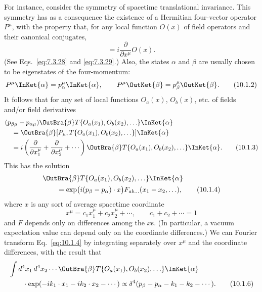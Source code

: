 For instance, consider the symmetry of spacetime translational invariance.
This symmetry has as a consequence the existence of a Hermitian
four-vector operator $P^\mu$, with the property that, for any local function
$O(x)$ of field operators and their canonical conjugates,
\begin{equation}
  [P_\mu,O(x)]=i\frac{\partial}{\partial x^\mu}O(x).
  \tag{10.1.1}\label{eq:10.1.1}
\end{equation}
(See Eqs.~\eqref{eq:7.3.28} and \eqref{eq:7.3.29}.) Also, the states $\alpha$ and $\beta$ are usually chosen
to be eigenstates of the four-momentum:
\begin{equation}
  P^\mu\InKet{\alpha}=p_\alpha^\mu\InKet{\alpha},
  \qquad
  P^\mu\OutKet{\beta}=p_\beta^\mu\OutKet{\beta}.
  \tag{10.1.2}\label{eq:10.1.2}
\end{equation}
It follows that for any set of local functions $O_a(x)$, $O_b(x)$, etc. of fields
and/or field derivatives
\begin{align}
  &(p_{\beta\mu}-p_{\alpha\mu})
  \OutBra{\beta}
  T\{O_a(x_1),O_b(x_2),\ldots\}
  \InKet{\alpha}
  \notag\\
  &\quad=\OutBra{\beta}
  [P_\mu,T\{O_a(x_1),O_b(x_2),\ldots\}]
  \InKet{\alpha}
  \notag\\
  &\quad=i\left(\frac{\partial}{\partial x_1^\mu}
  +\frac{\partial}{\partial x_2^\mu}+\cdots\right)
  \OutBra{\beta}
  T\{O_a(x_1),O_b(x_2),\ldots\}
  \InKet{\alpha}.
  \tag{10.1.3}\label{eq:10.1.3}
\end{align}
This has the solution
\begin{align}
  &\OutBra{\beta}
  T\{O_a(x_1),O_b(x_2),\ldots\}
  \InKet{\alpha}
  \notag\\
  &\qquad=\exp\bigl(i(p_\beta-p_\alpha)\cdot x\bigr)
  F_{ab\ldots}(x_1-x_2,\ldots),
  \tag{10.1.4}\label{eq:10.1.4}
\end{align}
where $x$ is any sort of average spacetime coordinate
\begin{equation}
  x^\mu=c_1x_1^\mu+c_2x_2^\mu+\cdots,
  \qquad c_1+c_2+\cdots=1
  \tag{10.1.5}\label{eq:10.1.5}
\end{equation}
and $F$ depends only on differences among the $x$s. (In particular, a vacuum
expectation value can depend only on the coordinate differences.) We can
Fourier transform Eq.~\eqref{eq:10.1.4} by integrating separately over $x^\mu$ and the
coordinate differences, with the result that
\begin{align}
  &\int d^4x_1\,d^4x_2\cdots
  \OutBra{\beta}
  T\{O_a(x_1),O_b(x_2),\ldots\}
  \InKet{\alpha}
  \notag\\
  &\qquad\cdot\exp(-ik_1\cdot x_1-ik_2\cdot x_2-\cdots)
  \propto\delta^4(p_\beta-p_\alpha-k_1-k_2-\cdots).
  \tag{10.1.6}\label{eq:10.1.6}
\end{align}
